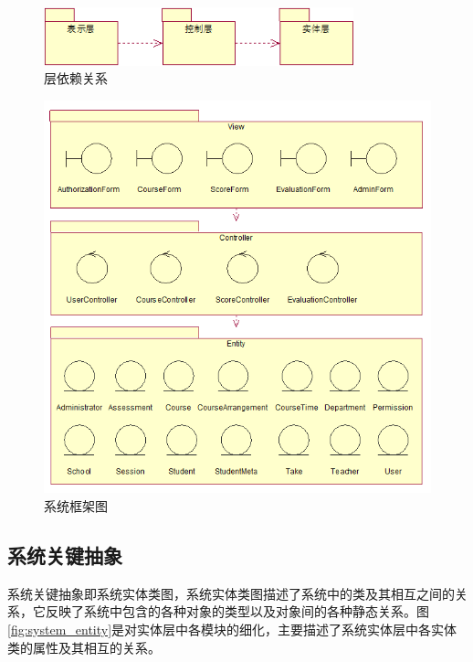 \begin{figure}[H]
  \centering
  \includegraphics[width=0.8\textwidth]{img/level_depend}
  \caption{层依赖关系}
  \label{fig:level_depend}
\end{figure}

\begin{figure}[H]
  \centering
  \includegraphics[width=\textwidth]{img/jwxt_system_arch}
  \caption{系统框架图}
  \label{fig:system_arch}
\end{figure}

\subsection{系统关键抽象}\label{sec:system_key_abstract}
系统关键抽象即系统实体类图，系统实体类图描述了系统中的类及其相互之间的关系，它反映了系统中包含的各种对象的类型以及对象间的各种静态关系。图\ref{fig:system_entity}是对实体层中各模块的细化，主要描述了系统实体层中各实体类的属性及其相互的关系。

